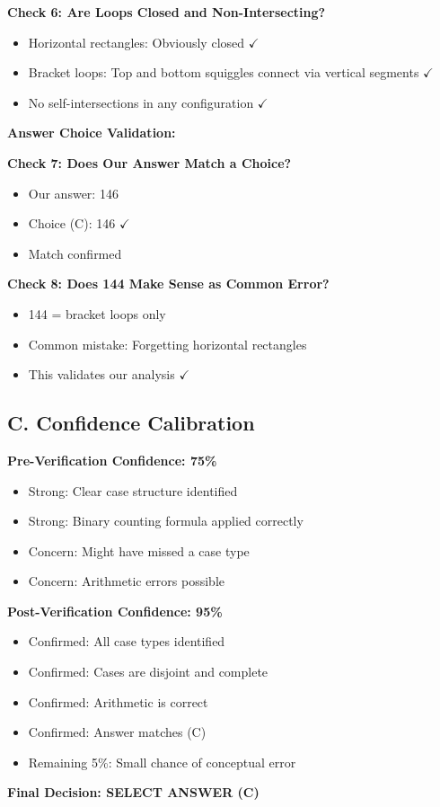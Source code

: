 \documentclass[12pt]{article}
\begin{document}
\begin{verificationbox}
\textbf{Check 6: Are Loops Closed and Non-Intersecting?}
\begin{itemize}
    \item Horizontal rectangles: Obviously closed $\checkmark$
    \item Bracket loops: Top and bottom squiggles connect via vertical segments $\checkmark$
    \item No self-intersections in any configuration $\checkmark$
\end{itemize}

\textbf{Answer Choice Validation:}

\textbf{Check 7: Does Our Answer Match a Choice?}
\begin{itemize}
    \item Our answer: 146
    \item Choice (C): 146 $\checkmark$
    \item Match confirmed
\end{itemize}

\textbf{Check 8: Does 144 Make Sense as Common Error?}
\begin{itemize}
    \item 144 = bracket loops only
    \item Common mistake: Forgetting horizontal rectangles
    \item This validates our analysis $\checkmark$
\end{itemize}

\subsection*{C. Confidence Calibration}

\textbf{Pre-Verification Confidence: 75\%}
\begin{itemize}
    \item Strong: Clear case structure identified
    \item Strong: Binary counting formula applied correctly
    \item Concern: Might have missed a case type
    \item Concern: Arithmetic errors possible
\end{itemize}

\textbf{Post-Verification Confidence: 95\%}
\begin{itemize}
    \item Confirmed: All case types identified
    \item Confirmed: Cases are disjoint and complete
    \item Confirmed: Arithmetic is correct
    \item Confirmed: Answer matches (C)
    \item Remaining 5\%: Small chance of conceptual error
\end{itemize}

\textbf{Final Decision: SELECT ANSWER (C)}

\end{verificationbox}
\end{document}
